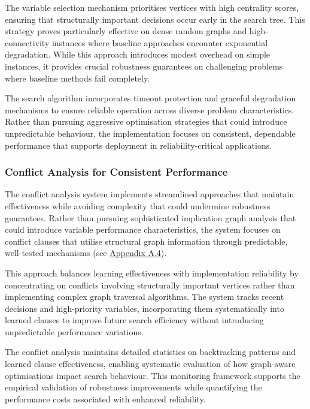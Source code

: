 The variable selection mechanism prioritises vertices with high centrality scores, ensuring that structurally important decisions occur early in the search tree. This strategy proves particularly effective on dense random graphs and high-connectivity instances where baseline approaches encounter exponential degradation. While this approach introduces modest overhead on simple instances, it provides crucial robustness guarantees on challenging problems where baseline methods fail completely.

The search algorithm incorporates timeout protection and graceful degradation mechanisms to ensure reliable operation across diverse problem characteristics. Rather than pursuing aggressive optimisation strategies that could introduce unpredictable behaviour, the implementation focuses on consistent, dependable performance that supports deployment in reliability-critical applications.

\subsubsection{Conflict Analysis for Consistent Performance}

The conflict analysis system implements streamlined approaches that maintain effectiveness while avoiding complexity that could undermine robustness guarantees. Rather than pursuing sophisticated implication graph analysis that could introduce variable performance characteristics, the system focuses on conflict clauses that utilise structural graph information through predictable, well-tested mechanisms (see \hyperref[appendix:conflict-analysis]{Appendix A.4}).

This approach balances learning effectiveness with implementation reliability by concentrating on conflicts involving structurally important vertices rather than implementing complex graph traversal algorithms. The system tracks recent decisions and high-priority variables, incorporating them systematically into learned clauses to improve future search efficiency without introducing unpredictable performance variations.

The conflict analysis maintains detailed statistics on backtracking patterns and lear\-ned clause effectiveness, enabling systematic evaluation of how graph-aware optimisations impact search behaviour. This monitoring framework supports the empirical validation of robustness improvements while quantifying the performance costs associated with enhanced reliability.

